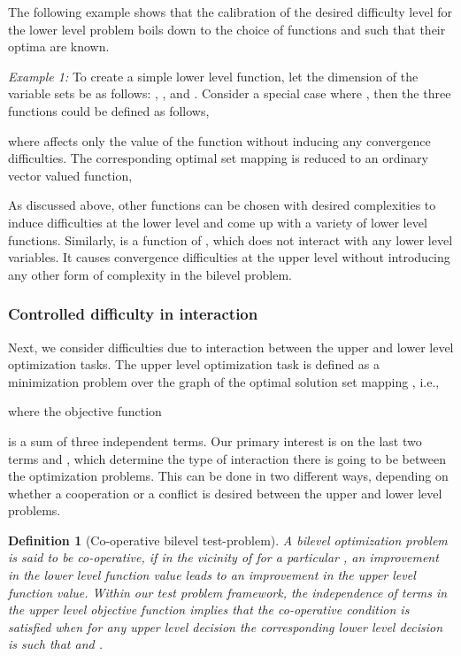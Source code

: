 \documentclass[twoside]{article}
\newtheorem{definition}[theorem]{Definition}
\begin{document}
The following example shows that the calibration of the desired difficulty level for the lower level problem boils down to the choice of functions  and  such that their optima are known.

\vskip 0.2cm
\textit{Example 1:}\label{ex:simple-lower}
To create a simple lower level function, let the dimension of the variable sets be as follows: , ,  and . Consider a special case where , then the three functions could be defined as follows,

where  affects only the value of the function without inducing any convergence difficulties. The corresponding optimal set mapping  is reduced to an ordinary vector valued function,


As discussed above, other functions can be chosen with desired complexities to induce difficulties at the lower level and come up with a variety of lower level functions. Similarly,  is a function of , which does not interact with any lower level variables. It causes convergence difficulties at the upper level without introducing any other form of complexity in the bilevel problem.

\subsubsection{Controlled difficulty in interaction}
Next, we consider difficulties due to interaction between the upper and lower level optimization tasks. The upper level optimization task is defined as a minimization problem over the graph of the optimal solution set mapping , i.e.,
 
where the objective function

is a sum of three independent terms. Our primary interest is on the last two terms  and , which determine the type of interaction there is going to be between the optimization problems. This can be done in two different ways, depending on whether a cooperation or a conflict is desired between the upper and lower level problems.  

\vskip 0.2cm
\begin{definition}[Co-operative bilevel test-problem]
A bilevel optimization problem is said to be co-operative, if in the vicinity of  for a particular , an improvement in the lower level function value leads to an improvement in the upper level function value.  Within our test problem framework, the independence of terms in the upper level objective function  implies that the co-operative condition is satisfied when for any upper level decision  the corresponding lower level decision  is such that  and .
\end{definition}
\vskip 0.2cm
\end{document}
